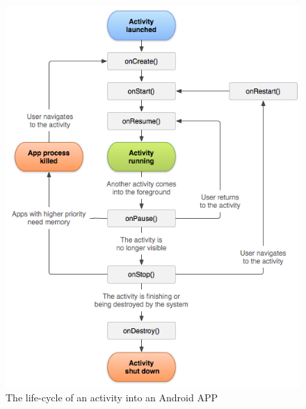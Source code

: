\begin{figure}[hbtp]
    \centering
    \includegraphics[scale=0.9]{images/SE_android_activities.png}
    \caption{The life-cycle of an activity into an Android APP}
    \label{fig:SE_android_activities}
\end{figure}